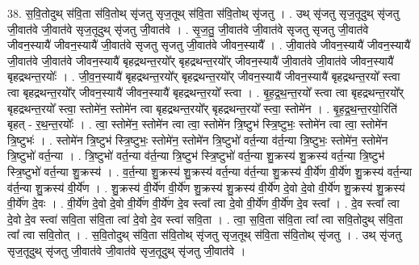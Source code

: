 \documentclass[17pt]{extarticle}
\begin{document}
38. स॒वि॒तोदुथ् स॑वि॒ता स॑वि॒तोथ् सृ॑जतु सृज॒तूथ् स॑वि॒ता स॑वि॒तोथ् सृ॑जतु । . उथ् सृ॑जतु सृज॒तूदुथ् सृ॑जतु जी॒वात॑वे जी॒वात॑वे सृज॒तूदुथ् सृ॑जतु जी॒वात॑वे । . सृ॒ज॒तु॒ जी॒वात॑वे जी॒वात॑वे सृजतु सृजतु जी॒वात॑वे जीवन॒स्यायै॑ जीवन॒स्यायै॑ जी॒वात॑वे सृजतु सृजतु जी॒वात॑वे जीवन॒स्यायै᳚ । . जी॒वात॑वे जीवन॒स्यायै॑ जीवन॒स्यायै॑ जी॒वात॑वे जी॒वात॑वे जीवन॒स्यायै॑ बृहद्रथन्त॒रयो᳚र् बृहद्रथन्त॒रयो᳚र् जीवन॒स्यायै॑ जी॒वात॑वे जी॒वात॑वे जीवन॒स्यायै॑ बृहद्रथन्त॒रयोः᳚ । . जी॒व॒न॒स्यायै॑ बृहद्रथन्त॒रयो᳚र् बृहद्रथन्त॒रयो᳚र् जीवन॒स्यायै॑ जीवन॒स्यायै॑ बृहद्रथन्त॒रयो᳚ स्त्वा त्वा बृहद्रथन्त॒रयो᳚र् जीवन॒स्यायै॑ जीवन॒स्यायै॑ बृहद्रथन्त॒रयो᳚ स्त्वा । . बृ॒ह॒द्र॒थ॒न्त॒रयो᳚ स्त्वा त्वा बृहद्रथन्त॒रयो᳚र् बृहद्रथन्त॒रयो᳚ स्त्वा॒ स्तोमे॑न॒ स्तोमे॑न त्वा बृहद्रथन्त॒रयो᳚र् बृहद्रथन्त॒रयो᳚ स्त्वा॒ स्तोमे॑न । . बृ॒ह॒द्र॒थ॒न्त॒रयो॒रिति॑ बृहत् - र॒थ॒न्त॒रयोः᳚ । . त्वा॒ स्तोमे॑न॒ स्तोमे॑न त्वा त्वा॒ स्तोमे॑न त्रि॒ष्टुभ॑ स्त्रि॒ष्टुभः॒ स्तोमे॑न त्वा त्वा॒ स्तोमे॑न त्रि॒ष्टुभः॑ । . स्तोमे॑न त्रि॒ष्टुभ॑ स्त्रि॒ष्टुभः॒ स्तोमे॑न॒ स्तोमे॑न त्रि॒ष्टुभो॑ वर्त॒न्या व॑र्त॒न्या त्रि॒ष्टुभः॒ स्तोमे॑न॒ स्तोमे॑न त्रि॒ष्टुभो॑ वर्त॒न्या । . त्रि॒ष्टुभो॑ वर्त॒न्या व॑र्त॒न्या त्रि॒ष्टुभ॑ स्त्रि॒ष्टुभो॑ वर्त॒न्या शु॒क्रस्य॑ शु॒क्रस्य॑ वर्त॒न्या त्रि॒ष्टुभ॑ स्त्रि॒ष्टुभो॑ वर्त॒न्या शु॒क्रस्य॑ । . व॒र्त॒न्या शु॒क्रस्य॑ शु॒क्रस्य॑ वर्त॒न्या व॑र्त॒न्या शु॒क्रस्य॑ वी॒र्ये॑ण वी॒र्ये॑ण शु॒क्रस्य॑ वर्त॒न्या व॑र्त॒न्या शु॒क्रस्य॑ वी॒र्ये॑ण । . शु॒क्रस्य॑ वी॒र्ये॑ण वी॒र्ये॑ण शु॒क्रस्य॑ शु॒क्रस्य॑ वी॒र्ये॑ण दे॒वो दे॒वो वी॒र्ये॑ण शु॒क्रस्य॑ शु॒क्रस्य॑ वी॒र्ये॑ण दे॒वः । . वी॒र्ये॑ण दे॒वो दे॒वो वी॒र्ये॑ण वी॒र्ये॑ण दे॒व स्त्वा᳚ त्वा दे॒वो वी॒र्ये॑ण वी॒र्ये॑ण दे॒व स्त्वा᳚ । . दे॒व स्त्वा᳚ त्वा दे॒वो दे॒व स्त्वा॑ सवि॒ता स॑वि॒ता त्वा॑ दे॒वो दे॒व स्त्वा॑ सवि॒ता । . त्वा॒ स॒वि॒ता स॑वि॒ता त्वा᳚ त्वा सवि॒तोदुथ् स॑वि॒ता त्वा᳚ त्वा सवि॒तोत् । . स॒वि॒तोदुथ् स॑वि॒ता स॑वि॒तोथ् सृ॑जतु सृज॒तूथ् स॑वि॒ता स॑वि॒तोथ् सृ॑जतु । . उथ् सृ॑जतु सृज॒तूदुथ् सृ॑जतु जी॒वात॑वे जी॒वात॑वे सृज॒तूदुथ् सृ॑जतु जी॒वात॑वे । \newline
\pagebreak
{}
\end{document}
